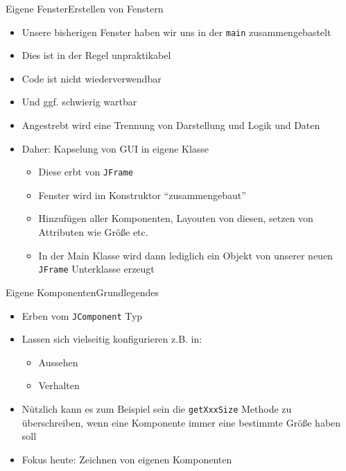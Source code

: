 \begin{frame}{Eigene Fenster}{Erstellen von Fenstern}
    \begin{itemize}
        \item Unsere bisherigen Fenster haben wir uns in der \texttt{main} zusammengebastelt
        \item Dies ist in der Regel unpraktikabel
        \item Code ist nicht wiederverwendbar
        \item Und ggf. schwierig wartbar
        \item Angestrebt wird eine Trennung von Darstellung und Logik und Daten
        \item Daher: Kapselung von GUI in eigene Klasse
        \begin{itemize}
            \item Diese erbt von \texttt{JFrame}
            \item Fenster wird im Konstruktor "`zusammengebaut"'
            \item Hinzufügen aller Komponenten, Layouten von diesen, setzen von Attributen wie Größe etc.
            \item In der Main Klasse wird dann lediglich ein Objekt von unserer neuen \texttt{JFrame} Unterklasse erzeugt
        \end{itemize}
    \end{itemize}
\end{frame}

\begin{frame}{Eigene Komponenten}{Grundlegendes}
    \begin{itemize}
        \item Erben vom \texttt{JComponent} Typ
        \item Lassen sich vielseitig konfigurieren z.B. in:
        \begin{itemize}
            \item Aussehen
            \item Verhalten
        \end{itemize}
        \item Nützlich kann es zum Beispiel sein die \texttt{getXxxSize} Methode zu überschreiben, wenn eine Komponente immer eine bestimmte Größe haben soll
        \item Fokus heute: Zeichnen von eigenen Komponenten
    \end{itemize}
\end{frame}

